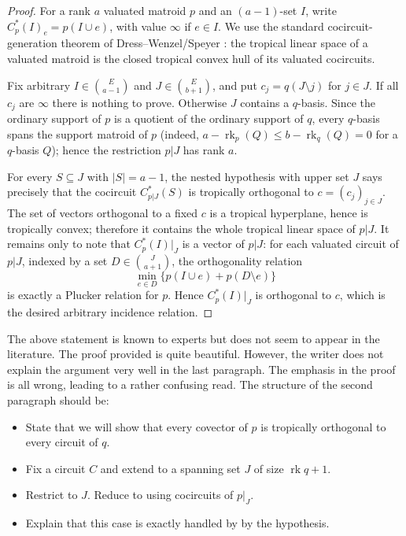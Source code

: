 \documentclass[12pt]{article}
\newcommand{\rk}{\operatorname{rk}}
\newcommand{\review}[1]{\begin{reviewbox}#1\end{reviewbox}}
\begin{document}
\begin{proof}
For a rank $a$ valuated matroid $p$ and an $(a-1)$-set $I$, write
$C^*_p(I)_e=p(I\cup e)$, with value $\infty$ if $e\in I$.  We use the
standard cocircuit-generation theorem of Dress--Wenzel/Speyer \cite{DW,Speyer}: the
tropical linear space of a valuated matroid is the closed tropical convex
hull of its valuated cocircuits.

Fix arbitrary $I\in\binom{E}{a-1}$ and $J\in\binom{E}{b+1}$, and put
$c_j=q(J\setminus j)$ for $j\in J$.  If all $c_j$ are $\infty$ there is
nothing to prove.  Otherwise $J$ contains a $q$-basis.  Since the
ordinary support of $p$ is a quotient of the ordinary support of $q$,
every $q$-basis spans the support matroid of $p$ (indeed,
$a-\rk_p(Q)\le b-\rk_q(Q)=0$ for a $q$-basis $Q$); hence the
restriction $p|J$ has rank $a$.

For every $S\subseteq J$ with $|S|=a-1$, the nested hypothesis with
upper set $J$ says precisely that the cocircuit $C^*_{p|J}(S)$ is
tropically orthogonal to $c=(c_j)_{j\in J}$.  The set of vectors
orthogonal to a fixed $c$ is a tropical hyperplane, hence is tropically
convex; therefore it contains the whole tropical linear space of $p|J$.
It remains only to note that $C^*_p(I)|_J$ is a vector of $p|J$: for
each valuated circuit of $p|J$, indexed by a set
$D\in\binom{J}{a+1}$, the orthogonality relation
\[
 \min_{e\in D}\{p(I\cup e)+p(D\setminus e)\}
\]
is exactly a Plucker relation for $p$.  Hence $C^*_p(I)|_J$ is
orthogonal to $c$, which is the desired arbitrary incidence relation.
\end{proof}
\review{The above statement is known to experts but does not seem to appear in the literature. The proof provided is quite beautiful. However, the writer does not explain the argument very well in the last paragraph. The emphasis in the proof is all wrong, leading to a rather confusing read.
The structure of the second paragraph should be:
\begin{itemize}
    \item State that we will show that every covector of $p$ is tropically orthogonal to every circuit of $q$.
    \item Fix a circuit $C$ and extend to a spanning set $J$ of size $\rk q + 1$.
    \item Restrict to $J$. Reduce to using cocircuits of $p|_J$.
    \item Explain that this case is exactly handled by by the hypothesis.
\end{itemize}}
\end{document}
